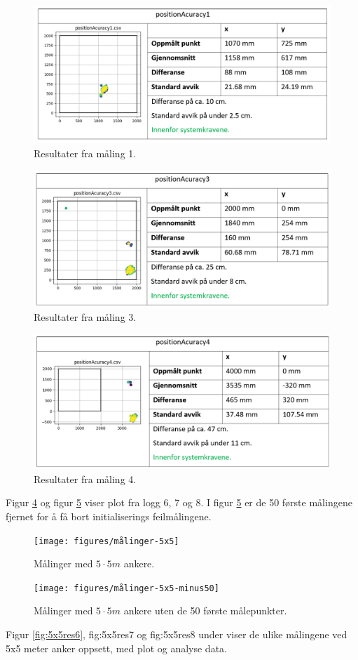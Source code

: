 \begin{figure}[htp]
\centering
\includegraphics[width=0.5\columnwidth]{figures/2x2resultat1}
\caption{Resultater fra måling 1.}
\label{fig:2x2res1}
\end{figure}
\begin{figure}[htp]
\centering
\includegraphics[width=0.5\columnwidth]{figures/2x2resultat3}
\caption{Resultater fra måling 3.}
\label{fig:2x2res3}
\end{figure}
\begin{figure}[htp]
\centering
\includegraphics[width=0.5\columnwidth]{figures/2x2resultat4}
\caption{Resultater fra måling 4.}
\label{fig:2x2res4}
\end{figure}

Figur \ref{fig:5x5målinger} og figur \ref{fig:5x5målinger50} viser plot fra logg 6, 7 og 8. 
I figur \ref{fig:5x5målinger50} er de 50 første målingene fjernet for å få bort initialiserings feilmålingene. 

\begin{figure}[htp]
\centering
\texttt{[image: figures/målinger-5x5]}
\caption{Målinger med $5\cdot5 m$ ankere.}
\label{fig:5x5målinger}
\end{figure}
\begin{figure}[htp]
\centering
\texttt{[image: figures/målinger-5x5-minus50]}
\caption{Målinger med $5\cdot5 m$ ankere uten de 50 første målepunkter.}
\label{fig:5x5målinger50}
\end{figure}

Figur \ref{fig:5x5res6}, {fig:5x5res7} og {fig:5x5res8} under viser de ulike målingene ved 5x5 meter anker oppsett, 
med plot og analyse data.

